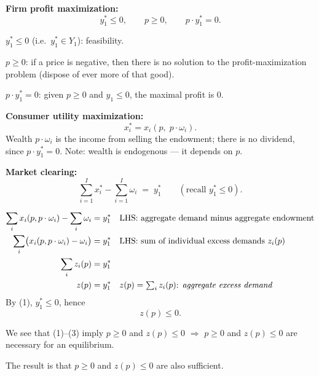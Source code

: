 \documentclass[11pt]{article}
\begin{document}
\begin{flatnum}
  \item \textbf{Firm profit maximization:}
        \[ y_1^*\le 0, \qquad p\ge 0, \qquad p\cdot y_1^*=0 . \]
        \begin{flatlist}
          \item $y_1^*\le 0$ (i.e.\ $y_1^*\in Y_1$): feasibility.
          \item $p\ge 0$: if a price is negative, then there is no solution to the
                profit-maximization problem (dispose of ever more of that good).
          \item $p\cdot y_1^*=0$: given $p\ge 0$ and $y_1\le 0$, the maximal profit is $0$.
        \end{flatlist}
  \item \textbf{Consumer utility maximization:}
        \[ x_i^*=x_i(p,\;p\cdot\omega_i). \]
        Wealth $p\cdot\omega_i$ is the income from selling the endowment; there is no
        dividend, since $p\cdot y_1^*=0$. Note: wealth is endogenous --- it depends on $p$.
  \item \textbf{Market clearing:}
        \[ \sum_{i=1}^{I}x_i^*-\sum_{i=1}^{I}\omega_i \;=\; y_1^*
           \qquad(\text{recall } y_1^*\le 0). \]
\end{flatnum}

\begin{align*}
  \sum_{i}x_i(p,p\cdot\omega_i)-\sum_{i}\omega_i &= y_1^*
     &&\text{LHS: aggregate demand minus aggregate endowment} \\
  \sum_{i}\bigl(x_i(p,p\cdot\omega_i)-\omega_i\bigr) &= y_1^*
     &&\text{LHS: sum of individual excess demands } z_i(p) \\
  \sum_{i}z_i(p) &= y_1^* \\
  z(p) &= y_1^*
     &&\text{$z(p)=\textstyle\sum_i z_i(p)$: \emph{aggregate excess demand}}
\end{align*}
By (1), $y_1^*\le 0$, hence
\[ z(p)\le 0 . \]

We see that (1)--(3) imply $p\ge 0$ and $z(p)\le 0$ $\Rightarrow$ $p\ge 0$ and $z(p)\le 0$
are necessary for an equilibrium.

The result is that $p\ge 0$ and $z(p)\le 0$ are also sufficient.

\begin{center}
\end{center}
\end{document}
